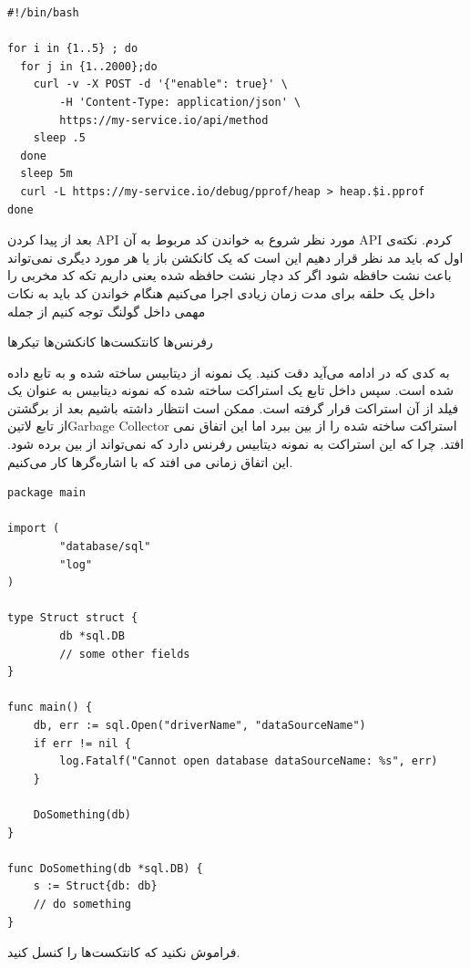 \documentclass[a4]{report}
\begin{document}
\begin{latin}
\begin{verbatim}
#!/bin/bash

for i in {1..5} ; do
  for j in {1..2000};do
    curl -v -X POST -d '{"enable": true}' \
        -H 'Content-Type: application/json' \
        https://my-service.io/api/method
    sleep .5
  done
  sleep 5m
  curl -L https://my-service.io/debug/pprof/heap > heap.$i.pprof
done
\end{verbatim}
\end{latin}

بعد از پیدا کردن API مورد نظر شروع به خواندن کد مربوط به آن API کردم. نکته‌ی اول که باید مد نظر قرار دهیم این است که یک کانکشن باز یا هر مورد دیگری نمی‌تواند باعث نشت حافظه شود
اگر کد دچار نشت حافظه شده یعنی داریم تکه کد مخربی را داخل یک حلقه برای مدت زمان زیادی اجرا می‌کنیم هنگام خواندن کد باید به نکات مهمی داخل گولنگ توجه کنیم از جمله

\شروع{شمارش}
 رفرنس‌ها
 کانتکست‌ها
\فقره کانکشن‌ها
\فقره تیکرها

به کدی که در ادامه می‌آید دقت کنید. یک نمونه از دیتابیس ساخته شده و به تابع داده شده است. سپس داخل تابع یک استراکت ساخته شده که نمونه دیتابیس به عنوان یک فیلد از آن استراکت قرار گرفته است.
ممکن است انتظار داشته باشیم بعد از برگشتن از تابع ‌لاتین{Garbage Collector} استراکت ساخته شده را از بین ببرد اما این اتفاق نمی افتد.
چرا که این استراکت به نمونه دیتابیس رفرنس دارد که نمی‌تواند از بین برده شود. این اتفاق زمانی می افتد که با اشاره‌گرها کار می‌کنیم.

\begin{latin}
\begin{verbatim}
package main

import (
        "database/sql"
        "log"
)

type Struct struct {
        db *sql.DB
        // some other fields
}

func main() {
    db, err := sql.Open("driverName", "dataSourceName")
    if err != nil {
        log.Fatalf("Cannot open database dataSourceName: %s", err)
    }

    DoSomething(db)
}

func DoSomething(db *sql.DB) {
    s := Struct{db: db}
    // do something
}
\end{verbatim}
\end{latin}

فراموش نکنید که کانتکست‌ها را کنسل کنید.
\end{document}
